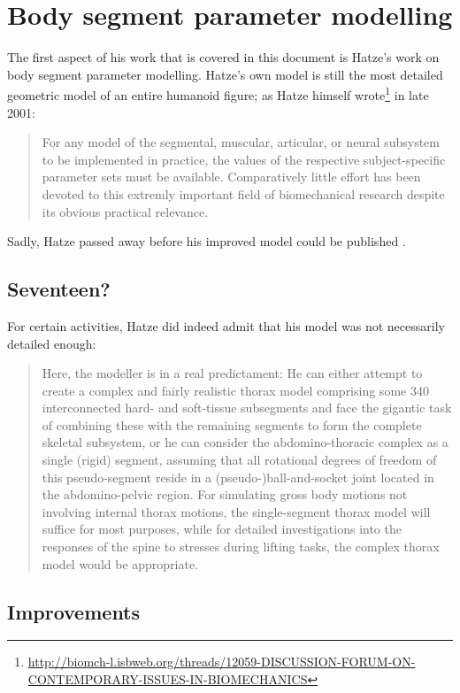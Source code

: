 \documentclass[a4paper]{article}
\begin{document}
\section{Body segment parameter modelling}

The first aspect of his work that is covered in this document is Hatze's work on body segment parameter modelling.
Hatze's own model \parencite{hatze1979-techreport} is still the most detailed geometric model of an entire humanoid figure; as Hatze himself wrote\footnote{\url{http://biomch-l.isbweb.org/threads/12059-DISCUSSION-FORUM-ON-CONTEMPORARY-ISSUES-IN-BIOMECHANICS}} in late 2001:
\begin{quote}
For any model of the segmental, muscular, articular, or neural subsystem
to be implemented in practice, the values of the respective
subject-specific parameter sets must be available.
Comparatively little
effort has been devoted to this extremly important field of
biomechanical research despite its obvious practical relevance.
\end{quote}
Sadly, Hatze passed away before his improved model could be published \parencite{hatze2005-ties-bsm}.

\subsection{Seventeen?}

For certain activities, Hatze did indeed admit that his model was not necessarily detailed enough:
\begin{quote}
Here, the modeller is in a real predictament: He can either attempt to create a complex and fairly realistic thorax model comprising some 340 interconnected hard- and soft-tissue subsegments and face the gigantic task of combining these with the remaining segments to form the complete skeletal subsystem, or he can consider the abdomino-thoracic complex as a single (rigid) segment, assuming that all rotational degrees of freedom of this pseudo-segment reside in a (pseudo-)ball-and-socket joint located in the abdomino-pelvic region. For simulating gross body motions not involving internal thorax motions, the single-segment thorax model will suffice for most purposes, while for detailed investigations into the responses of the spine to stresses during lifting tasks, the complex thorax model would be appropriate.
\parencite{hatze1998-bio-sports}
\end{quote}

\subsection{Improvements}
\end{document}
